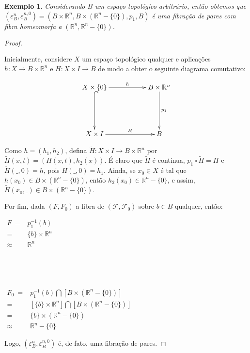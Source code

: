 \documentclass[12pt,oneside]{book} %
\newtheorem{ex}     {\hspace{0.5cm}Exemplo}[chapter]
\newcommand{\R}{\mathbb{R}}
\newcommand{\wt}{\widetilde}
\begin{document}
\begin{ex}\label{pf_trivial}
	Considerando $B$ um espaço topológico arbitrário, então obtemos que $(\varepsilon_{B}^{n},\varepsilon_{B}^{n,0})=(B\times\R^{n},B\times(\R^{n}-\{ 0 \}),p_{1},B)$ é uma fibração de pares com fibra homeomorfa a $(\R^{n},\R^{n}-\{ 0 \})$.
\end{ex}
\begin{proof}
	
	\
	
	\par Inicialmente, considere $X$ um espaço topológico qualquer e aplicações $h:X\to B\times\R^{n}$ e $H:X\times I\to B$ de modo a obter o seguinte diagrama comutativo:
	
	$$\xymatrix @C=0.5cm {
		X\times\{ 0 \} \ar[rrr]^-{h} \ar@{^(->}[dd] &&& B\times\R^{n} \ar[dd]^-{p_{1}} \\
		&&& \\
		X\times I \ar[rrr]^-{H} &&& B
	}$$
	
	\par Como $h=(h_{1},h_{2})$, defina $\wt{H}:X\times I\to B\times\R^{n}$ por $\wt{H}(x,t)=(H(x,t),h_{2}(x))$. É claro que $\wt{H}$ é contínua, $p_{1}\circ\wt{H}=H$ e $\wt{H}(\_,0)=h$, pois $H(\_,0)=h_{1}$. Ainda, se $x_{0}\in X$ é tal que $h(x_{0})\in B\times (\R^{n}-\{ 0 \})$, então $h_{2}(x_{0})\in \R^{n}-\{ 0 \}$, e assim, $\wt{H}(x_{0},\_)\in B\times(\R^{n}-\{ 0 \})$.
	
	\par Por fim, dada $(F,F_{0})$ a fibra de $(\mathcal{F},\mathcal{F}_{0})$ sobre $b\in B$ qualquer, então: \newline
	
	$\begin{array}{rl}
		F \ = & p_{1}^{-1}(b) \\
		= & \{ b \}\times\R^{n} \\
		\approx & \R^{n}
	\end{array}$
	
	\
	
	\
	
	$\begin{array}{rl}
		F_{0} \ = & p_{1}^{-1}(b)\bigcap [B\times(\R^{n}-\{ 0 \})] \\
		= & [\{ b \}\times\R^{n}]\bigcap [B\times(\R^{n}-\{ 0 \})] \\
		= & \{ b \}\times(\R^{n}-\{ 0 \}) \\
		\approx & \R^{n}-\{ 0 \}
	\end{array}$ \newline
	
	\par Logo, $(\varepsilon_{B}^{n},\varepsilon_{B}^{n,0})$ é, de fato, uma fibração de pares.
	
\end{proof}
\end{document}
